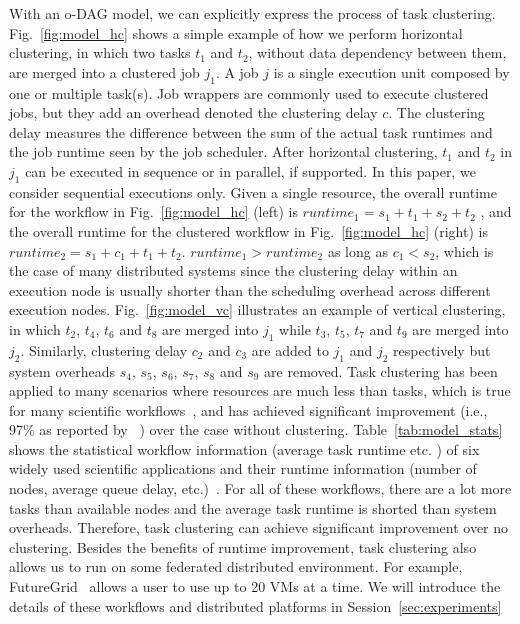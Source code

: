 With an o-DAG model, we can explicitly express the process of task clustering. Fig.~\ref{fig:model_hc} shows a simple example of how we perform horizontal clustering, in which two tasks $t_1$ and $t_2$, without data dependency between them, are merged into a clustered job $j_1$. A job $j$ is a single execution unit composed by one or multiple task(s). Job wrappers are commonly used to execute clustered jobs, but they add an overhead denoted the clustering delay $c$. The clustering delay measures the difference between the sum of the actual task runtimes and the job runtime seen by the job scheduler. 
After horizontal clustering, $t_1$ and $t_2$ in $j_1$ can be executed in sequence or in parallel, if supported. In this paper, we consider sequential executions only. Given a single resource, the overall runtime for the workflow in Fig.~\ref{fig:model_hc} (left) is $runtime_1=s_1+t_1+s_2+t_2$ , and the overall runtime for the clustered workflow in Fig.~\ref{fig:model_hc} (right) is $runtime_2=s_1+c_1+t_1+t_2$.  $runtime_1 > runtime_2$ as long as $c_1 < s_2$, which is the case of many distributed systems since the clustering delay within an execution node is usually shorter than the scheduling overhead across different execution nodes. Fig.~\ref{fig:model_vc} illustrates an example of vertical clustering, in which $t_2$, $t_4$, $t_6$ and $t_8$ are merged into $j_1$ while $t_3$, $t_5$, $t_7$ and $t_9$ are merged into $j_2$. Similarly, clustering delay $c_2$ and $c_3$ are added to $j_1$ and $j_2$ respectively but system overheads $s_4$, $s_5$, $s_6$, $s_7$, $s_8$ and $s_9$ are removed. Task clustering has been applied to many scenarios where resources are much less than tasks, which is true for many scientific workflows~\cite{Singh2008, Ying2009, Zomaya2004}, and has achieved significant improvement (i.e., 97\% as reported by ~\cite{Singh2008}) over the case without clustering. Table~\ref{tab:model_stats} shows the statistical workflow information (average task runtime etc. ) of six widely used scientific applications and their runtime information (number of nodes, average queue delay, etc.)~\cite{Chen2011}. For all of these workflows, there are a lot more tasks than available nodes and the average task runtime is shorted than system overheads. Therefore, task clustering can achieve significant improvement over no clustering. Besides the benefits of runtime improvement, task clustering also allows us to run on some federated distributed environment. For example, FutureGrid~\cite{FutureGrid} allows a user to use up to 20 VMs at a time. We will introduce the details of these workflows and distributed platforms in Session~\ref{sec:experiments}
